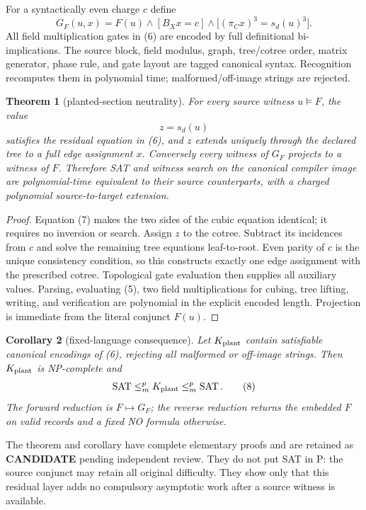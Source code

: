 \documentclass[11pt]{article}
\newtheorem{theorem}{Theorem}
\newtheorem{corollary}[theorem]{Corollary}
\newcommand{\CAND}{\textbf{CANDIDATE}}
\begin{document}
For a syntactically even charge $c$ define
\[
G_F(u,x)=F(u)\land[B_Xx=c]\land
 \bigl[(\pi_Cx)^3=s_d(u)^3\bigr].                       \tag{6}
\]
All field multiplication gates in (6) are encoded by full definitional
bi-implications.  The source block, field modulus, graph, tree/cotree order,
matrix generator, phase rule, and gate layout are tagged canonical syntax.
Recognition recomputes them in polynomial time; malformed/off-image strings
are rejected.

\begin{theorem}[planted-section neutrality]
For every source witness $u\models F$, the value
\[
z=s_d(u)                                                   \tag{7}
\]
satisfies the residual equation in (6), and $z$ extends uniquely through the
declared tree to a full edge assignment $x$.  Conversely every witness of
$G_F$ projects to a witness of $F$.  Therefore SAT and witness search on the
canonical compiler image are polynomial-time equivalent to their source
counterparts, with a charged polynomial source-to-target extension.
\end{theorem}
\begin{proof}
Equation (7) makes the two sides of the cubic equation identical; it requires
no inversion or search.  Assign $z$ to the cotree.  Subtract its incidences
from $c$ and solve the remaining tree equations leaf-to-root.  Even parity of
$c$ is the unique consistency condition, so this constructs exactly one
edge assignment with the prescribed cotree.  Topological gate evaluation
then supplies all auxiliary values.  Parsing, evaluating (5), two field
multiplications for cubing, tree lifting, writing, and verification are
polynomial in the explicit encoded length.  Projection is immediate from the
literal conjunct $F(u)$.
\end{proof}

\begin{corollary}[fixed-language consequence]
Let $K_{\rm plant}$ contain satisfiable canonical encodings of (6), rejecting
all malformed or off-image strings.  Then $K_{\rm plant}$ is NP-complete and
\[
\operatorname{SAT}\le_m^p K_{\rm plant}\le_m^p
\operatorname{SAT}.                                     \tag{8}
\]
The forward reduction is $F\mapsto G_F$; the reverse reduction returns the
embedded $F$ on valid records and a fixed NO formula otherwise.
\end{corollary}

The theorem and corollary have complete elementary proofs and are retained as
\CAND{} pending independent review.  They do not put SAT in P: the source
conjunct may retain all original difficulty.  They show only that this
residual layer adds no compulsory asymptotic work after a source witness is
available.
\end{document}
